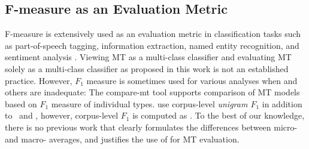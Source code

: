 \subsection{F-measure as an Evaluation Metric}
F-measure \cite{Rijsbergen-1979-F-meas, chinchor-1992-F-meas} is extensively used as an evaluation metric in classification tasks such as part-of-speech tagging, information extraction, named entity recognition, and sentiment analysis \cite{derczynski-2016-f-score}.
Viewing MT as a multi-class classifier and evaluating MT solely as a multi-class classifier as proposed in this work is not an established practice.
However, $F_1$ measure is sometimes used for various analyses when \bleu{} and others are inadequate: The compare-mt tool \citep{neubig-etal-2019-compareMT} supports comparison of MT models based on $F_1$ measure of individual types.
\citet{sennrich-etal-2016-bpe} use corpus-level \textit{unigram $F_1$} in addition to \bleu\ and \chrf{}, however, corpus-level $F_1$ is computed as . %
To the best of our knowledge, there is no previous work that clearly formulates the differences between micro- and macro- averages, and justifies the use of  for MT evaluation. 
